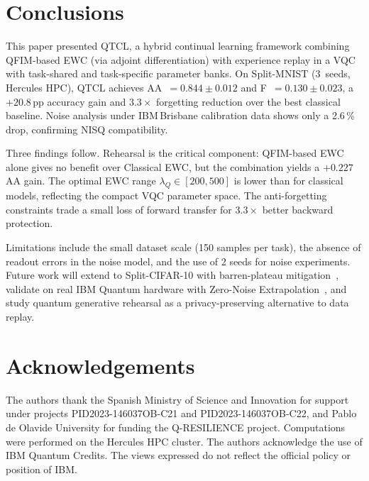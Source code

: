 \documentclass{llncs}
\begin{document}
\section{Conclusions}
\label{sec:conclusion}

This paper presented QTCL, a hybrid continual learning framework combining
QFIM-based EWC (via adjoint differentiation) with experience replay in a VQC
with task-shared and task-specific parameter banks.
On Split-MNIST (3~seeds, Hercules HPC), QTCL achieves AA~$=0.844\pm0.012$
and F~$=0.130\pm0.023$, a $+20.8$\,pp accuracy gain and $3.3\times$ forgetting
reduction over the best classical baseline.
Noise analysis under IBM\,Brisbane calibration data shows only a 2.6\,\% drop,
confirming NISQ compatibility.

Three findings follow.
Rehearsal is the critical component: QFIM-based EWC alone gives no benefit
over Classical EWC, but the combination yields a $+0.227$ AA gain.
The optimal EWC range $\lambda_Q\in[200,500]$ is lower than for classical
models, reflecting the compact VQC parameter space.
The anti-forgetting constraints trade a small loss of forward transfer for
$3.3\times$ better backward protection.

Limitations include the small dataset scale (150 samples per task), the absence
of readout errors in the noise model, and the use of 2 seeds for noise experiments.
Future work will extend to Split-CIFAR-10 with barren-plateau
mitigation~\cite{larocca2024review}, validate on real IBM Quantum hardware
with Zero-Noise Extrapolation~\cite{wang2021noise}, and study quantum generative
rehearsal as a privacy-preserving alternative to data replay.

\section*{Acknowledgements}
The authors thank the Spanish Ministry of Science and Innovation for support
under projects PID2023-146037OB-C21 and PID2023-146037OB-C22, and Pablo de
Olavide University for funding the Q-RESILIENCE project.
Computations were performed on the Hercules HPC cluster.
The authors acknowledge the use of IBM Quantum Credits.
The views expressed do not reflect the official policy or position of IBM.



\end{document}
